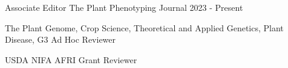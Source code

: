 
\begin{cventries}

  \cventry
    {Associate Editor} %
    {The Plant Phenotyping Journal} %
    {} %
    {2023 - Present} %
    {}

  \cventry
    {The Plant Genome, Crop Science, Theoretical and Applied Genetics, Plant Disease, G3} %
    {Ad Hoc Reviewer} %
    {} %
    {} %
    {}

  \cventry
    {USDA NIFA AFRI} %
    {Grant Reviewer} %
    {} %
    {} %
    {}

\end{cventries}
